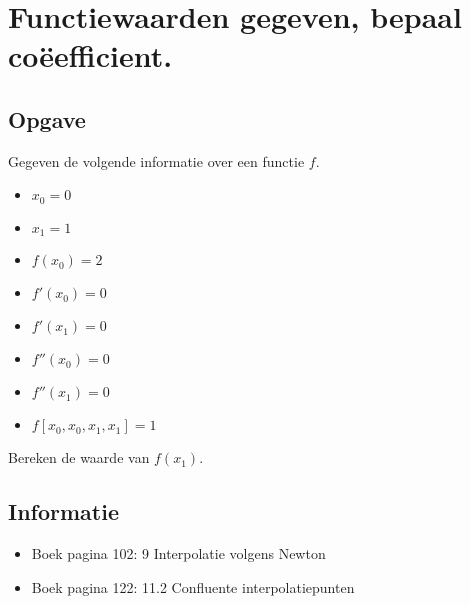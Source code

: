 \documentclass[examenvragen.tex]{subfiles}
\begin{document}
\section{Functiewaarden gegeven, bepaal co\"eefficient.}
\subsection{Opgave}
Gegeven de volgende informatie over een functie $f$.
\begin{multicols}{4}
\begin{itemize}
\item $x_0 = 0$
\item $x_1 = 1$
\item $f(x_0) = 2$
\item $f'(x_0) = 0$
\item $f'(x_1) = 0$
\item $f''(x_0) = 0$
\item $f''(x_1) = 0$
\item $f[x_0,x_0,x_1,x_1] = 1$
\end{itemize}
\end{multicols}
Bereken de waarde van $f(x_1)$.

\subsection{Informatie}
\begin{itemize}
\item Boek pagina 102: 9 Interpolatie volgens Newton
\item Boek pagina 122: 11.2 Confluente interpolatiepunten\end{itemize}
\end{document}
